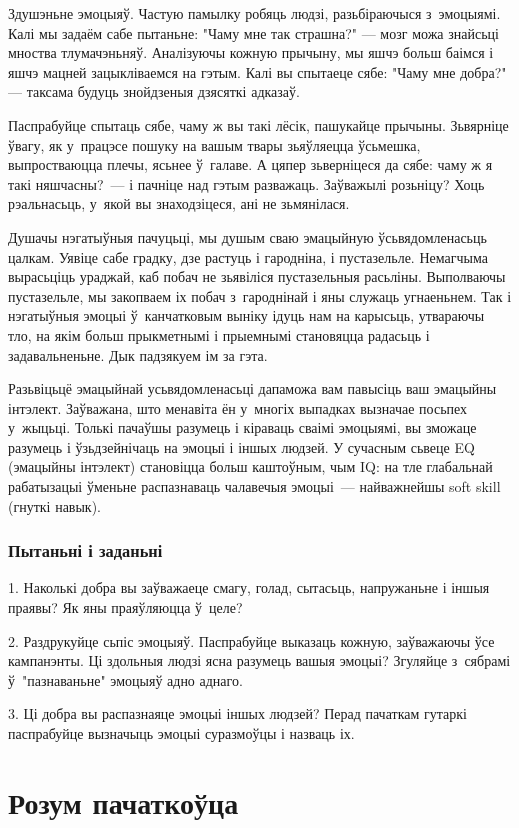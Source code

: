 Здушэньне эмоцыяў. Частую памылку робяць людзі, разьбіраючыся з~эмоцыямі. Калі мы задаём сабе пытаньне: "Чаму мне так страшна?" --- мозг можа знайсьці мноства тлумачэньняў. Аналізуючы кожную прычыну, мы яшчэ больш баімся і яшчэ мацней зацыкліваемся на гэтым. Калі вы спытаеце сябе: "Чаму мне добра?" --- таксама будуць знойдзеныя дзясяткі адказаў.

Паспрабуйце спытаць сябе, чаму ж вы такі лёсік, пашукайце прычыны. Зьвярніце ўвагу, як у~працэсе пошуку на вашым твары зьяўляецца ўсьмешка, выпростваюцца плечы, ясьнее ў~галаве. А цяпер зьверніцеся да сябе: чаму ж я такі няшчасны?~--- і пачніце над гэтым разважаць. Заўважылі розьніцу? Хоць рэальнасьць, у~якой вы знаходзіцеся, ані не зьмянілася.

Душачы нэгатыўныя пачуцьці, мы душым сваю эмацыйную ўсьвядомленасьць цалкам. Уявіце сабе градку, дзе растуць і гародніна, і пустазельле. Немагчыма вырасьціць ураджай, каб побач не зьявіліся пустазельныя расьліны. Выполваючы пустазельле, мы закопваем іх побач з~гароднінай і яны служаць угнаеньнем. Так і нэгатыўныя эмоцыі ў~канчатковым выніку ідуць нам на карысьць, утвараючы тло, на якім больш прыкметнымі і прыемнымі становяцца радасьць і задавальненьне. Дык падзякуем ім за гэта.

Разьвіцьцё эмацыйнай усьвядомленасьці дапаможа вам павысіць ваш эмацыйны інтэлект. Заўважана, што менавіта ён у~многіх выпадках вызначае посьпех у~жыцьці. Толькі пачаўшы разумець і кіраваць сваімі эмоцыямі, вы зможаце разумець і ўзьдзейнічаць на эмоцыі і іншых людзей. У сучасным сьвеце EQ (эмацыйны інтэлект) становіцца больш каштоўным, чым IQ: на тле глабальнай рабатызацыі ўменьне распазнаваць чалавечыя эмоцыі~--- найважнейшы soft skill (гнуткі навык).

\subsubsection{Пытаньні і заданьні}

1. Наколькі добра вы заўважаеце смагу, голад, сытасьць, напружаньне і іншыя праявы? Як яны праяўляюцца ў~целе?

2. Раздрукуйце сьпіс эмоцыяў. Паспрабуйце выказаць кожную, заўважаючы ўсе кампанэнты. Ці здольныя людзі ясна разумець вашыя эмоцыі? Згуляйце з~сябрамі ў~"пазнаваньне" эмоцыяў адно аднаго.

3. Ці добра вы распазнаяце эмоцыі іншых людзей? Перад пачаткам гутаркі паспрабуйце вызначыць эмоцыі суразмоўцы і назваць іх.


\section{Розум пачаткоўца}

